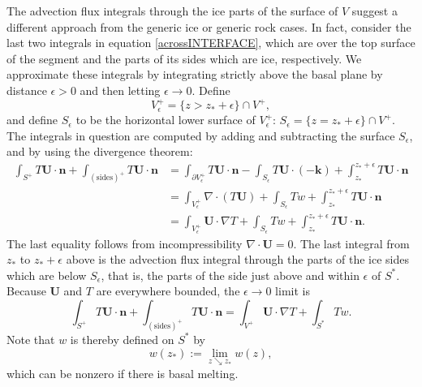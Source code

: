 \documentclass[12pt,final]{amsart}%
\theoremstyle{plain}
\theoremstyle{definition}
\theoremstyle{remark}
\newcommand{\diverg}{\nabla\cdot}
\newcommand{\Div}{\diverg}
\def\eps{\epsilon}
\newcommand{\grad}{\nabla}
\newcommand{\khat}{\mathbf{k}}
\newcommand{\nhat}{\mathbf{n}}
\newcommand{\bU}{{\mathbf{U}}}
\begin{document}
The advection flux integrals through the ice parts of the surface of $V$ suggest a different approach from the generic ice or generic rock cases.  In fact, consider the last two integrals in equation \eqref{acrossINTERFACE}, which are over the top surface of the segment and the parts of its sides which are ice, respectively.  We approximate these integrals by integrating strictly above the basal plane by distance $\eps>0$  and then letting $\eps\to 0$.  Define
    $$V_\eps^+ = \{z > z_\ast+\eps\} \cap V^+,$$
and define $S_\eps$ to be the horizontal lower surface of $V_\eps^+$: $S_\eps = \{z = z_\ast + \eps\} \cap V^+$.  The integrals in question are computed by adding and subtracting the surface $S_\eps$, and by using the divergence theorem:
\begin{align*}
\int_{S^+} T \bU\cdot \nhat + \int_{(\text{sides})^+} T \bU\cdot \nhat &= \int_{\partial V_\eps^+} T \bU\cdot \nhat - \int_{S_\eps} T \bU\cdot (-\khat) + \int_{z_\ast}^{z_\ast+\eps} T \bU\cdot \nhat \\
    &= \int_{V_\eps^+} \Div\left(T\bU\right) + \int_{S_\eps} T w + \int_{z_\ast}^{z_\ast+\eps} T \bU\cdot \nhat \\
    &= \int_{V_\eps^+} \bU\cdot \grad T + \int_{S_\eps} T w + \int_{z_\ast}^{z_\ast+\eps} T \bU\cdot \nhat.
\end{align*}
The last equality follows from incompressibility $\Div\bU=0$.  The last integral from $z_\ast$ to $z_\ast + \eps$ above is the advection flux integral through the parts of the ice sides which are below $S_\eps$, that is, the parts of the side just above and within $\eps$ of $S^\ast$.  Because $\bU$ and $T$ are everywhere bounded, the $\eps \to 0$ limit is
\begin{equation}\label{advectfluxINTERFACE}
\int_{S^+} T \bU\cdot \nhat + \int_{(\text{sides})^+} T \bU\cdot \nhat = \int_{V^+} \bU\cdot \grad T + \int_{S^\ast} T w.
\end{equation}
Note that $w$ is thereby defined on $S^\ast$ by
    $$w(z_\ast) := \lim_{z\searrow z_\ast} w(z),$$
which can be nonzero if there is basal melting.
\end{document}
